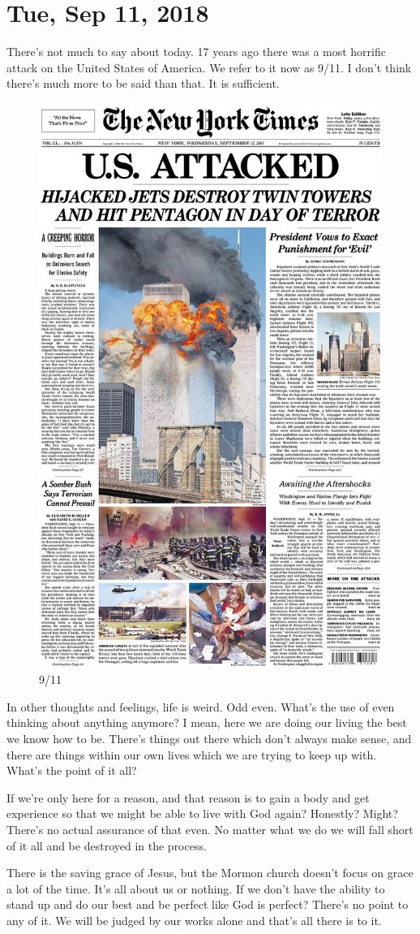 \section{Tue, Sep 11, 2018}

There's not much to say about today. 17 years ago there was a most horrific attack on
the United States of America. We refer to it now as 9/11. I don't think there's much
more to be said than that. It is sufficient.

\begin{figure}[h!]
  \centering
  \includegraphics[width=.5\linewidth]{2018/images/911.jpg}
  \caption{9/11}
  \label{fig:nine11}
\end{figure}

In other thoughts and feelings, life is weird. Odd even. What's the use of even
thinking about anything anymore? I mean, here we are doing our living the best we
know how to be. There's things out there which don't always make sense, and there are
things within our own lives which we are trying to keep up with. What's the point of
it all?

If we're only here for a reason, and that reason is to gain a body and get experience
so that we might be able to live with God again? Honestly? Might? There's no actual
assurance of that even. No matter what we do we will fall short of it all and be
destroyed in the process.

There is the saving grace of Jesus, but the Mormon church doesn't focus on grace a
lot of the time. It's all about us or nothing. If we don't have the ability to stand
up and do our best and be perfect like God is perfect? There's no point to any of it.
We will be judged by our works alone and that's all there is to it.

